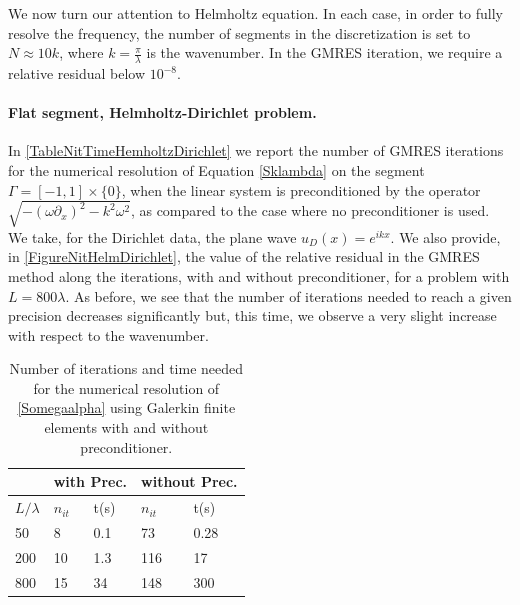 \documentclass[a4paper]{subfiles}
\begin{document}
\vspace*{0.5cm}

We now turn our attention to Helmholtz equation. In each case, in order to fully resolve the frequency, the number of segments in the 
discretization is set to $N \approx 10k$, where $k = \frac{\pi}{\lambda}$ is the wavenumber. In the GMRES iteration, we require a relative 
residual below $10^{-8}$. 

\paragraph{Flat segment, Helmholtz-Dirichlet problem.} 
In \autoref{TableNitTimeHemholtzDirichlet} we report the number of GMRES iterations for the numerical resolution of Equation \eqref{Sklambda} 
on the segment $\Gamma = [-1,1]\times \{0\}$, when the linear system is preconditioned by the operator $\sqrt{-(\omega \partial_x)^2 - k^2 \omega^2}$, as 
compared to the case where no preconditioner is used.  We take, for the Dirichlet data, the plane wave $u_D(x) = e^{ikx}$. We also provide, in 
\autoref{FigureNitHelmDirichlet}, the value of the relative residual in the GMRES method along the iterations, with and without preconditioner, 
for a problem with $L = 800 \lambda$. As before, we see that the number of iterations needed to reach a given precision decreases significantly but, this time, 
we observe a very slight increase with respect to the wavenumber. 
\begin{table}[H]
	\begin{center}
		\begin{tabular}{m{4em} | m{4em} | m{4em} | m{4em} | m{4em}} 
			\hline
			\multicolumn{1}{c|}{ }&
			\multicolumn{2}{c|}{with Prec.}&\multicolumn{2}{c}{without Prec.}\\
			\hline
			$L/\lambda$ & $n_{it}$& t(s) & $n_{it}$ & t(s)\\
			\hline\hline
			50 & 8 & 0.1 & 73 & 0.28\\
			\hline
			200 & 10 & 1.3 & 116 & 17\\
			\hline
			800 & 15 & 34 & 148 & 300\\
			\hline
		\end{tabular}
	\end{center}
	\caption{Number of iterations and time needed for the numerical resolution of \eqref{Somegaalpha} using Galerkin finite elements with and without preconditioner.}
	\label{TableNitTimeHemholtzDirichlet}
\end{table}
\vspace{-1cm}
\end{document}
